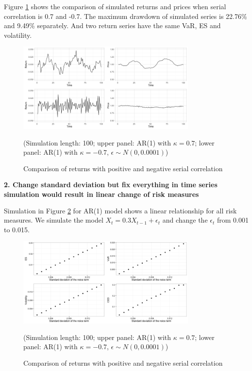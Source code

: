 \documentclass[11pt]{article}
\begin{document}
Figure \ref{fig:Comparison_pos_neg_autocorrelation} shows the comparison of simulated returns and prices when serial correlation is 0.7 and -0.7. The maximum drawdown of simulated series is 22.76\% and 9.49\% separately. And two return series have the same VaR, ES and volatility.

\begin{figure}[H]
\centering
\includegraphics[width = 0.8\textwidth]{../figures/simulation/Comparison_pos_neg_autocorrelation}
\caption{Comparison of returns with positive and negative serial correlation}
(Simulation length: 100; upper panel: AR(1) with $\kappa=0.7$; lower panel: AR(1) with $\kappa=-0.7$, $\epsilon\sim N(0, 0.0001)$)
\label{fig:Comparison_pos_neg_autocorrelation}
\end{figure}

\textbf{2. Change standard deviation but fix everything in time series simulation would result in linear change of risk measures}

Simulation in Figure \ref{fig:change_std_simulation} for AR(1) model shows a linear relationship for all risk measures. We simulate the model $X_t = 0.3X_{t-1} + \epsilon_t$ and change the $\epsilon_t$ from 0.001 to 0.015.

\begin{figure}[H]
\centering
\includegraphics[width = 0.8\textwidth]{../figures/simulation/AR1_risk_measures_change_sd}
\caption{Comparison of returns with positive and negative serial correlation}
(Simulation length: 100; upper panel: AR(1) with $\kappa=0.7$; lower panel: AR(1) with $\kappa=-0.7$, $\epsilon\sim N(0, 0.0001)$)
\label{fig:change_std_simulation}
\end{figure}
\end{document}
